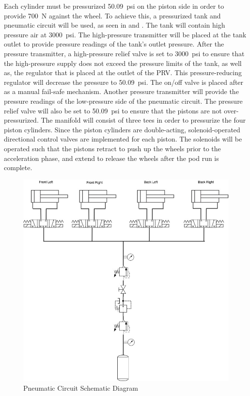 \documentclass[main.tex]{subfiles}
\begin{document}
	Each cylinder must be pressurized \SI{50.09}{psi} on the piston side in order to provide \SI{700}{N} against the wheel. To achieve this, a pressurized tank and pneumatic circuit will be used, as seen in  and . The tank will contain high pressure air at \SI{3000}{psi}. The high-pressure transmitter will be placed at the tank outlet to provide pressure readings of the tank’s outlet pressure. After the pressure transmitter, a high-pressure relief valve is set to \SI{3000}{psi} to ensure that the high-pressure supply does not exceed the pressure limits of the tank, as well as, the regulator that is placed at the outlet of the PRV. This pressure-reducing regulator will decrease the pressure to \SI{50.09}{psi}. The on/off valve is placed after as a manual fail-safe mechanism. Another pressure transmitter will provide the pressure readings of the low-pressure side of the pneumatic circuit. The pressure relief valve will also be set to \SI{50.09}{psi} to ensure that the pistons are not over-pressurized. The manifold will consist of three tees in order to pressurize the four piston cylinders.  Since the piston cylinders are double-acting, solenoid-operated directional control valves are implemented for each piston. The solenoids will be operated such that the pistons retract to push up the wheels prior to the acceleration phase, and extend to release the wheels after the pod run is complete.\\
      
	\begin{figure}
        \centering
        \includegraphics[width=\linewidth] {images/Pneumatic_Circuit}
        \caption{Pneumatic Circuit Schematic Diagram}
        \label{fig:pneumatic-diagram}
    \end{figure} 
\end{document}
